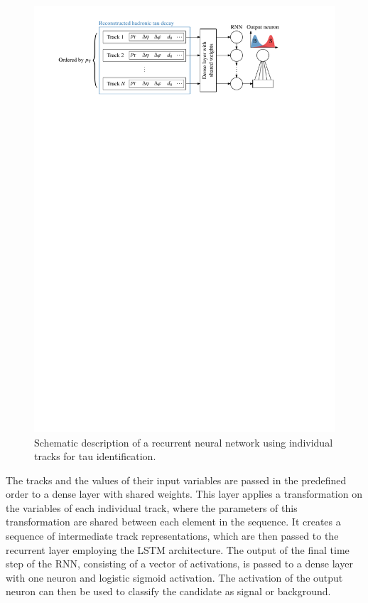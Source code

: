 \begin{figure}[htb]
  \centering
  \includegraphics[scale=0.9]{./figures/rnn/track_rnn_schematic.pdf}
  \caption{Schematic description of a recurrent neural network using individual
    tracks for tau identification.}
  \label{fig:track_rnn_schematic}
\end{figure}

The tracks and the values of their input variables are passed in the predefined
order to a dense layer with shared weights. This layer applies a transformation
on the variables of each individual track, where the parameters of this
transformation are shared between each element in the sequence. It creates a
sequence of intermediate track representations, which are then passed to the
recurrent layer employing the LSTM architecture. The output of the final time
step of the RNN, consisting of a vector of activations, is passed to a dense
layer with one neuron and logistic sigmoid activation. The activation of the
output neuron can then be used to classify the \tauhadvis candidate as signal or
background. 

